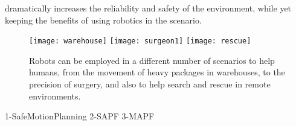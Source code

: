 dramatically increases the reliability and safety of the environment, while yet
keeping the benefits of using robotics in the scenario.
\begin{figure}[htpb]
  \centering
  \texttt{[image: warehouse]}
  \texttt{[image: surgeon1]}
  \texttt{[image: rescue]}
  \caption{Robots can be employed in a different number of scenarios to help
  humans, from the movement of heavy packages in warehouses, to the precision
  of surgery, and also to help search and rescue in remote environments.}
  \label{fig:robot_examples}
\end{figure}
%
%
%
{1-SafeMotionPlanning}
{2-SAPF}
{3-MAPF}
